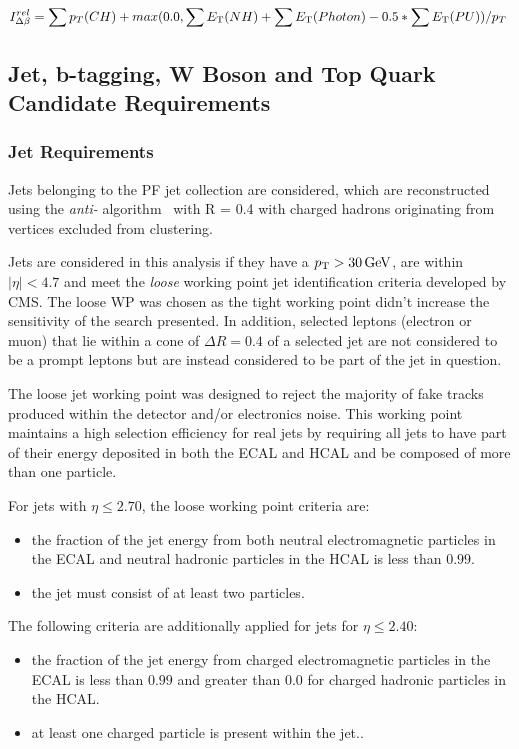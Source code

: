 \begin{equation}
I^{rel}_{\Delta\beta} = \sum p_T(CH) + max (0.0, \sum E_{\rm T}(NH) + \sum E_{\rm T}(Photon) - 0.5 * \sum E_{\rm T}(PU))/p_T \;
\end{equation}\label{eq:deltaBeta}

\subsection{Jet, b-tagging, W Boson and Top Quark Candidate Requirements}
\subsubsection{Jet Requirements}
Jets belonging to the PF jet collection are considered, which are reconstructed using the \emph{anti-\kt} algorithm~\cite{Cacciari:2008gp} with R = 0.4 with charged hadrons originating from \PU vertices excluded from clustering.

Jets are considered in this analysis if they have a $p_{\mathrm{T}} > 30\,\text{Ge\hspace{-.08em}V}$, are within $|\eta| < 4.7$ and meet the \emph{loose} working point jet identification criteria developed by CMS.
The loose WP was chosen as the tight working point didn't increase the sensitivity of the search presented.
In addition, selected leptons (electron or muon) that lie within a cone of $\Delta R = 0.4$ of a selected jet are not considered to be a prompt leptons but are instead considered to be part of the jet in question.

The loose jet working point was designed to reject the majority of fake tracks produced within the detector and/or electronics noise. 
This working point maintains a high selection efficiency for real jets by requiring all jets to have part of their energy deposited in both the ECAL and HCAL and be composed of more than one particle.

For jets with $\eta \leq 2.70$, the loose working point criteria are:
\begin{itemize}
\item the fraction of the jet energy from both neutral electromagnetic particles in the ECAL and neutral hadronic particles in the HCAL is less than $0.99$.
\item the jet must consist of at least two particles.
\end{itemize}

The following criteria are additionally applied for jets for $\eta \leq 2.40$:
\begin{itemize}
\item the fraction of the jet energy from charged electromagnetic particles in the ECAL is less than $0.99$ and greater than 0.0 for charged hadronic particles in the HCAL.
\item at least one charged particle is present within the jet..
\end{itemize}

